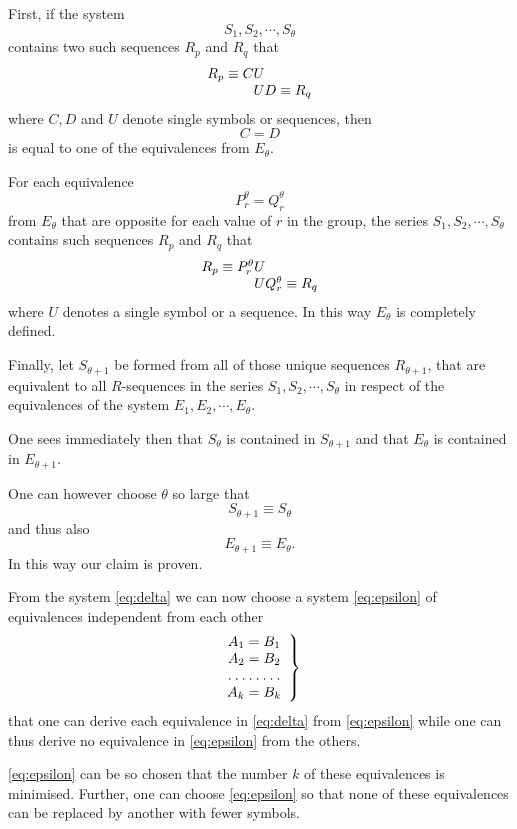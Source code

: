 First, if the system
$$S_1, S_2, \cdots, S_\theta$$
contains two such sequences $R_p$ and $R_q$ that
$$\begin{array}{r@{}c@{}l}
R_p \equiv C &U&\\
             &U&D \equiv R_q
\end{array}$$
where $C, D$ and $U$ denote single symbols or sequences, then
$$C = D$$
is equal to one of the equivalences from $E_\theta$.

For each equivalence
$$P^\theta_r = Q^\theta_r$$
from $E_\theta$ that are opposite for each value of $r$ in the group,
the series $S_1, S_2, \cdots, S_\theta$ contains such sequences $R_p$
and $R_q$ that 
$$\begin{array}{r@{}c@{}l}
R_p \equiv P^\theta_r &U&\\
             &U&Q^\theta_r \equiv R_q
\end{array}$$
where  $U$ denotes a single symbol or a sequence.  In this way
$E_\theta$ is completely defined.

Finally, let $S_{\theta+1}$ be formed from all of those unique sequences
$R_{\theta+1}$, that are equivalent to all $R$-sequences in the series
$S_1, S_2, \cdots, S_\theta$ in
respect of the equivalences of the system $E_1, E_2, \cdots,
E_\theta$.

One sees immediately then that $S_\theta$ is contained in
$S_{\theta+1}$ and that $E_\theta$ is contained in $E_{\theta+1}$.

One can however choose $\theta$ so large that
$$S_{\theta+1} \equiv S_\theta$$
and thus also
$$E_{\theta+1} \equiv E_\theta.$$
In this way our claim is proven.

\bigskip

From the system \eqref{eq:delta} we can now choose a system
\eqref{eq:epsilon} of equivalences independent from each other
\begin{gather}
\left.\begin{array}{c}
A_1 = B_1\\
A_2 = B_2\\
\hdotsfor{1}\\
A_k = B_k
\end{array}\right\}
\label{eq:epsilon}
\end{gather}
that one can derive each equivalence in \eqref{eq:delta} from
\eqref{eq:epsilon} while one can thus derive no equivalence in
\eqref{eq:epsilon} from the others.

\eqref{eq:epsilon} can be so chosen that the number $k$ of these
equivalences is minimised.  Further, one can choose \eqref{eq:epsilon}
so that none of these equivalences can be replaced by another with
fewer symbols.

